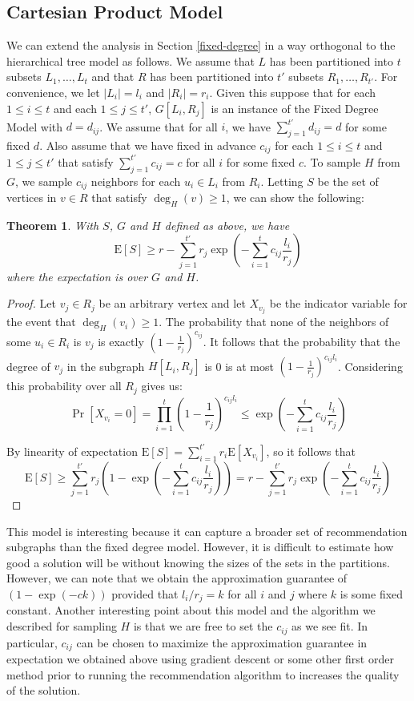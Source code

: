 \documentclass[11pt]{article}
\newcommand{\E}{\text{E}}
\newtheorem{thm}{Theorem}
\begin{document}
\subsection{Cartesian Product Model}
\label{cartesian}
We can extend the analysis in Section \ref{fixed-degree} in a way
orthogonal to the hierarchical tree model as follows. We assume that
$L$ has been partitioned into $t$ subsets $L_1,\ldots, L_t$ and
that $R$ has been partitioned into $t'$ subsets $R_1,\ldots,
R_{t'}$. For convenience, we let $|L_i| = l_i$ and $|R_i|=r_i$. Given
this suppose that for each $1\leq i\leq t$ and each $1\leq j\leq t'$,
$G[L_i, R_j]$ is an instance of the Fixed Degree Model with
$d=d_{ij}$. We assume that for all $i$, we have $\sum_{j=1}^{t'}
d_{ij} = d$ for some fixed $d$. Also assume that we have fixed in
advance $c_{ij}$ for each $1\leq i\leq t$ and $1\leq j\leq t'$ that
satisfy $\sum_{j=1}^{t'} c_{ij} = c$ for all $i$ for some fixed $c$.
To sample $H$ from $G$, we sample $c_{ij}$ neighbors for each 
$u_i\in L_i$ from $R_i$. Letting $S$ be the set of vertices in 
$v\in R$ that satisfy $\deg_H(v)\geq 1$, we can show the following:

\begin{thm}
With $S$, $G$ and $H$ defined as above, we have
\[ \E[S] \geq r - \sum_{j=1}^{t'} r_j \exp\left(-\sum_{i=1}^t c_{ij} \frac{l_i}{r_j}\right)\]
where the expectation is over $G$ and $H$.
\end{thm}
\begin{proof}
Let $v_j \in R_j$ be an arbitrary vertex and let $X_{v_j}$ be the
indicator variable for the event that $\deg_H(v_i) \geq 1$. The
probability that none of the neighbors of some $u_i\in R_i$ is $v_j$
is exactly $(1-\frac{1}{r_j})^{c_{ij}}$. It follows that the
probability that the degree of $v_j$ in the subgraph $H[L_i,R_j]$ is 0
is at most $(1-\frac{1}{r_j})^{c_{ij}l_i}$. Considering this
probability over all $R_j$ gives us:
\[ \Pr[X_{v_i} = 0] = \prod_{i=1}^{t} \left(1-\frac{1}{r_j}\right)^{c_{ij} l_i} \leq \exp\left(-\sum_{i=1}^t c_{ij} \frac{l_i}{r_j}\right)\]

By linearity of expectation $\E[S] = \sum_{i=1}^{t'} r_i \E[X_{v_i}]$,
so it follows that
\[ \E[S] \geq \sum_{j=1}^{t'} r_j \left(1-\exp\left(-\sum_{i=1}^t c_{ij} \frac{l_i}{r_j}\right)\right) = r - \sum_{j=1}^{t'} r_j \exp\left(-\sum_{i=1}^t c_{ij} \frac{l_i}{r_j}\right)\]
\end{proof}

This model is interesting because it can capture a broader set of
recommendation subgraphs than the fixed degree model. However, it is
difficult to estimate how good a solution will be without knowing
the sizes of the sets in the partitions. However, we can note that we
obtain the approximation guarantee of $(1-\exp(-ck))$ provided that
$l_i/r_j = k$ for all $i$ and $j$ where $k$ is some fixed
constant. Another interesting point about this model and the algorithm
we described for sampling $H$ is that we are free to set the $c_{ij}$
as we see fit. In particular, $c_{ij}$ can be chosen to maximize the
approximation guarantee in expectation we obtained above using
gradient descent or some other first order method prior to running the
recommendation algorithm to increases the quality of the solution.
\end{document}
